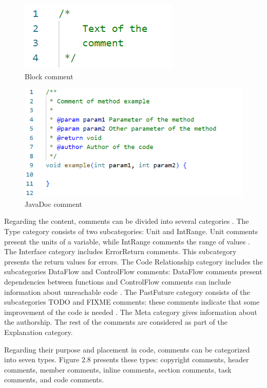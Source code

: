 \begin{figure} [H]
  \centering
  \includegraphics [scale=1]
  {figures/multiline.png}
  \caption{Block comment
  \cite{de2011comment}}
  \label{fig:AnhangsChor}
\end{figure}

\begin{figure} [H]
  \centering
  \includegraphics [scale=0.9]
  {figures/javad.png}
  \caption{JavaDoc comment
  \cite{de2011comment}}
  \label{fig:AnhangsChor}
\end{figure}

Regarding the content, comments can be divided into several categories \cite{de2011comment}. The Type category consists of two subcategories: Unit and IntRange. Unit comments present the units of a variable, while IntRange comments the range of values \cite{de2011comment}.
The Interface category includes ErrorReturn comments. This subcategory presents the return values for errors. 
The Code Relationship category includes the subcategories DataFlow and ControlFlow comments: DataFlow comments present dependencies between functions and ControlFlow comments can include information about unreachable code \cite{de2011comment}.
The PastFuture category consists of the subcategories TODO and FIXME comments: these comments indicate that some improvement of the code is needed \cite{de2011comment}.
The Meta category gives information about the authorship. The rest of the comments are considered as part of the Explanation category.


Regarding their purpose and placement in code, comments can be categorized into seven types.  Figure 2.8 presents these types: copyright comments, header comments, member comments, inline comments, section comments, task comments, and code comments. 

